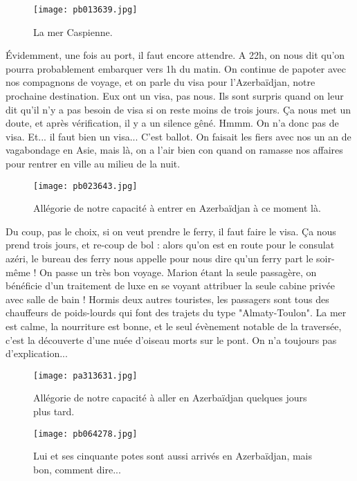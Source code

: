 \documentclass{book}
\begin{document}
\begin{figure}[h]
\centering
\texttt{[image: pb013639.jpg]}
\caption*{La mer Caspienne.}
\end{figure}

Évidemment, une fois au port, il faut encore attendre. A 22h, on nous dit qu'on pourra probablement embarquer vers 1h du matin. On continue de papoter avec nos compagnons de voyage, et on parle du visa pour l’Azerbaïdjan, notre prochaine destination. Eux ont un visa, pas nous. Ils sont surpris quand on leur dit qu'il n'y a pas besoin de visa si on reste moins de trois jours. Ça nous met un doute, et après vérification, il y a un silence gêné. Hmmm. On n'a donc pas de visa. Et... il faut bien un visa... C'est ballot. On faisait les fiers avec nos un an de vagabondage en Asie, mais là, on a l'air bien con quand on ramasse nos affaires pour rentrer en ville au milieu de la nuit.


\begin{figure}[h]
\centering
\texttt{[image: pb023643.jpg]}
\caption*{Allégorie de notre capacité à entrer en Azerbaïdjan à ce moment là.}
\end{figure}

Du coup, pas le choix, si on veut prendre le ferry, il faut faire le visa. Ça nous prend trois jours, et re-coup de bol : alors qu'on est en route pour le consulat azéri, le bureau des ferry nous appelle pour nous dire qu'un ferry part le soir-même ! On passe un très bon voyage. Marion étant la seule passagère, on bénéficie d'un traitement de luxe en se voyant attribuer la seule cabine privée avec salle de bain ! Hormis deux autres touristes, les passagers sont tous des chauffeurs de poids-lourds qui font des trajets du type "Almaty-Toulon". La mer est calme, la nourriture est bonne, et le seul évènement notable de la traversée, c'est la découverte d'une nuée d'oiseau morts sur le pont. On n'a toujours pas d'explication...


\begin{figure}[h]
\centering
\texttt{[image: pa313631.jpg]}
\caption*{Allégorie de notre capacité à aller en Azerbaïdjan quelques jours plus tard.}
\end{figure}


\begin{figure}[h]
\centering
\texttt{[image: pb064278.jpg]}
\caption*{Lui et ses cinquante potes sont aussi arrivés en Azerbaïdjan, mais bon, comment dire...}
\end{figure}
\end{document}
